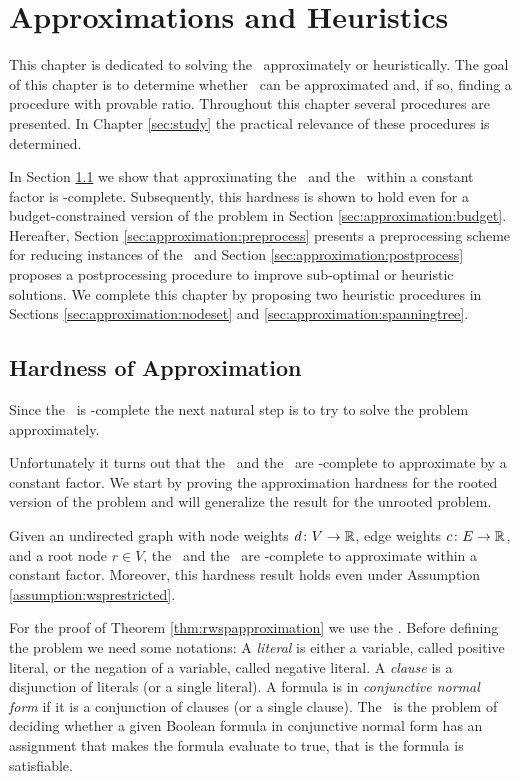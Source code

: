 \section{Approximations and Heuristics}
\label{sec:approximation}


This chapter is dedicated to solving the \WSP\ approximately or heuristically. The goal of this chapter is to determine whether \WSP\ can be approximated and, if so, finding a procedure with provable ratio. Throughout this chapter several procedures are presented. In Chapter \ref{sec:study} the practical relevance of these procedures is determined.\medskip

In Section \ref{sec:approximation:hardness} we show that approximating the \WSP\ and the \WISP\ within a constant factor is \NP-complete. Subsequently, this hardness is shown to hold even for a budget-constrained version of the problem in Section \ref{sec:approximation:budget}. Hereafter, Section \ref{sec:approximation:preprocess} presents a preprocessing scheme for reducing instances of the \WSP\ and Section \ref{sec:approximation:postprocess} proposes a postprocessing procedure to improve sub-optimal or heuristic solutions. We complete this chapter by proposing two heuristic procedures in Sections \ref{sec:approximation:nodeset} and \ref{sec:approximation:spanningtree}.

\subsection{Hardness of Approximation}
\label{sec:approximation:hardness}

Since the \WSP\ is \NP-complete the next natural step is to try to solve the problem approximately.\medskip

Unfortunately it turns out that the \WSP\ and the \WISP\ are \NP-complete to approximate by a constant factor. We start by proving the approximation hardness for the rooted version of the problem and will generalize the result for the unrooted problem.

\begin{theorem}
	\label{thm:rwspapproximation}
	Given an undirected graph with node weights $d \colon V \to \mathbb{R}$, edge weights $c \colon E \to \mathbb{R}$, and a root node $r \in V$, the \RWSP\ and the \RWISP\ are \NP-complete to approximate within a constant factor. Moreover, this hardness result holds even under Assumption \ref{assumption:wsprestricted}.
\end{theorem}

For the proof of Theorem \ref{thm:rwspapproximation} we use the \SAT. Before defining the problem we need some notations: A \textit{literal} is either a variable, called positive literal, or the negation of a variable, called negative literal. A \textit{clause} is a disjunction of literals (or a single literal). A formula is in \textit{conjunctive normal form} if it is a conjunction of clauses (or a single clause). The \SAT\ is the problem of deciding whether a given Boolean formula in conjunctive normal form has an assignment that makes the formula evaluate to true, that is the formula is satisfiable.

